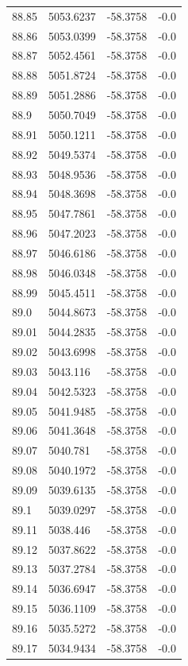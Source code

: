 \begin{table}[H]
\begin{tabular}{llll}
88.85 & 5053.6237 & -58.3758 & -0.0 \\
88.86 & 5053.0399 & -58.3758 & -0.0 \\
88.87 & 5052.4561 & -58.3758 & -0.0 \\
88.88 & 5051.8724 & -58.3758 & -0.0 \\
88.89 & 5051.2886 & -58.3758 & -0.0 \\
88.9 & 5050.7049 & -58.3758 & -0.0 \\
88.91 & 5050.1211 & -58.3758 & -0.0 \\
88.92 & 5049.5374 & -58.3758 & -0.0 \\
88.93 & 5048.9536 & -58.3758 & -0.0 \\
88.94 & 5048.3698 & -58.3758 & -0.0 \\
88.95 & 5047.7861 & -58.3758 & -0.0 \\
88.96 & 5047.2023 & -58.3758 & -0.0 \\
88.97 & 5046.6186 & -58.3758 & -0.0 \\
88.98 & 5046.0348 & -58.3758 & -0.0 \\
88.99 & 5045.4511 & -58.3758 & -0.0 \\
89.0 & 5044.8673 & -58.3758 & -0.0 \\
89.01 & 5044.2835 & -58.3758 & -0.0 \\
89.02 & 5043.6998 & -58.3758 & -0.0 \\
89.03 & 5043.116 & -58.3758 & -0.0 \\
89.04 & 5042.5323 & -58.3758 & -0.0 \\
89.05 & 5041.9485 & -58.3758 & -0.0 \\
89.06 & 5041.3648 & -58.3758 & -0.0 \\
89.07 & 5040.781 & -58.3758 & -0.0 \\
89.08 & 5040.1972 & -58.3758 & -0.0 \\
89.09 & 5039.6135 & -58.3758 & -0.0 \\
89.1 & 5039.0297 & -58.3758 & -0.0 \\
89.11 & 5038.446 & -58.3758 & -0.0 \\
89.12 & 5037.8622 & -58.3758 & -0.0 \\
89.13 & 5037.2784 & -58.3758 & -0.0 \\
89.14 & 5036.6947 & -58.3758 & -0.0 \\
89.15 & 5036.1109 & -58.3758 & -0.0 \\
89.16 & 5035.5272 & -58.3758 & -0.0 \\
89.17 & 5034.9434 & -58.3758 & -0.0 \\

\end{tabular}
\end{table}
